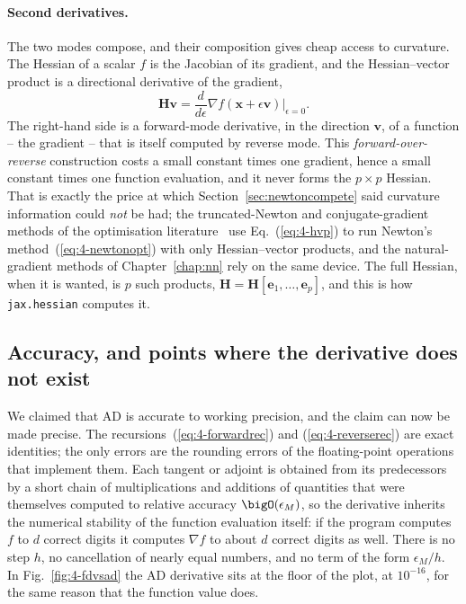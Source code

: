 \paragraph{Second derivatives.}
The two modes compose, and their composition gives cheap access to curvature.
The Hessian of a scalar $f$ is the Jacobian of its gradient, and the
Hessian--vector product is a directional derivative of the gradient,
\begin{equation}
  \bm{H}\bm{v}
   = \frac{d}{d\epsilon}\nabla f(\bm{x}+\epsilon\bm{v})\Big|_{\epsilon=0} .
  \label{eq:4-hvp}
\end{equation}
The right-hand side is a forward-mode derivative, in the direction $\bm{v}$,
of a function -- the gradient -- that is itself computed by reverse mode.
This \emph{forward-over-reverse} construction costs a small constant times
one gradient, hence a small constant times one function evaluation, and it
never forms the $p\times p$ Hessian.  That is exactly the price at which
Section~\ref{sec:newtoncompete} said curvature information could \emph{not}
be had; the truncated-Newton and conjugate-gradient methods of the
optimisation literature~\cite{nocedal2006} use Eq.~(\ref{eq:4-hvp}) to run
Newton's method~(\ref{eq:4-newtonopt}) with only Hessian--vector products,
and the natural-gradient methods of Chapter~\ref{chap:nn} rely on the same
device.  The full Hessian, when it is wanted, is $p$ such products,
$\bm{H}=\bm{H}[\bm{e}_1,\dots,\bm{e}_p]$, and this is how
\texttt{jax.hessian} computes it.

\subsection{Accuracy, and points where the derivative does not exist}
\label{sec:adaccuracy}

We claimed that AD is accurate to working precision, and the claim can now be
made precise.  The recursions~(\ref{eq:4-forwardrec}) and
(\ref{eq:4-reverserec}) are exact identities; the only errors are the rounding
errors of the floating-point operations that implement them.  Each tangent or
adjoint is obtained from its predecessors by a short chain of multiplications
and additions of quantities that were themselves computed to relative accuracy
$\bigO(\epsilon_M)$, so the derivative inherits the numerical stability of the
function evaluation itself: if the program computes $f$ to $d$ correct digits
it computes $\nabla f$ to about $d$ correct digits as well.  There is no
step $h$, no cancellation of nearly equal numbers, and no term of the form
$\epsilon_M/h$.  In Fig.~\ref{fig:4-fdvsad} the AD derivative sits at the
floor of the plot, at $10^{-16}$, for the same reason that the function value
does.

